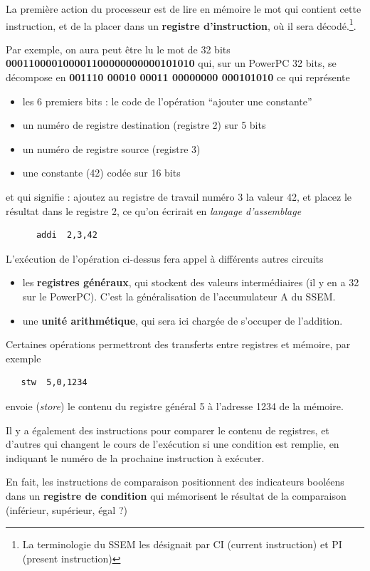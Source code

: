 \begin{multicols}{2}
La première action du processeur est de lire en mémoire le mot qui
contient cette instruction, et de la placer dans un \textbf{registre
  d'instruction}, où il sera décodé.\footnote{La terminologie du SSEM
les désignait par  CI (current instruction) et PI (present instruction)}.

Par exemple, on aura peut être lu le mot de 32 bits
\textbf{000110000100001100000000000101010}
qui, sur un PowerPC 32 bits, se décompose en
\textbf{001110 00010 00011 00000000 000101010}
ce qui représente
\begin{itemize}
\item les 6 premiers bits : le code de l'opération ``ajouter une constante''
\item un numéro de registre destination (registre 2) sur 5 bits
\item un numéro de registre source (registre 3)
\item une constante (42) codée sur 16 bits
\end{itemize}
et qui signifie : ajoutez au registre de travail numéro 3 la valeur 42, 
et placez le résultat dans le registre 2, ce qu'on écrirait en 
\emph{langage 
d'assemblage} 
\begin{verbatim}
	  addi  2,3,42
\end{verbatim}

L'exécution de l'opération ci-dessus fera appel à différents autres circuits
\begin{itemize}
\item les \textbf{registres généraux}, qui stockent des valeurs intermédiaires
(il y en a 32 sur le PowerPC). C'est la généralisation de l'accumulateur A
du SSEM.
\item une \textbf{unité arithmétique}, qui sera ici chargée de
  s'occuper de l'addition.
\end{itemize}

Certaines opérations permettront des transferts entre registres et mémoire, 
par exemple
\begin{verbatim}
   stw  5,0,1234
\end{verbatim}
envoie (\emph{store}) le contenu du registre général 5 à l'adresse
1234 de la mémoire.

Il y a également des instructions pour comparer le contenu de registres,
et d'autres qui changent le cours de l'exécution si une condition
est remplie, en indiquant le numéro de la prochaine instruction à exécuter.

En fait, les instructions de comparaison positionnent
des indicateurs booléens dans un \textbf{registre de condition}
qui mémorisent le résultat de la comparaison 
(inférieur, supérieur, égal ?)


\end{multicols}
